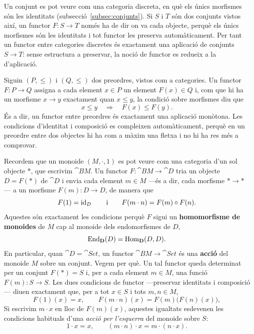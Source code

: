 \begin{exemple}
Un conjunt es pot veure com una categoria discreta, en què els únics morfismes són les identitats (subsecció~\ref{subsec:conjunts}). Si $S$ i $T$ són dos conjunts vistos així, un functor $F\colon S\to T$ només ha de dir on va cada objecte, perquè els únics morfismes són les identitats i tot functor les preserva automàticament. Per tant un functor entre categories discretes és exactament una aplicació de conjunts $S\to T$: sense estructura a preservar, la noció de functor es redueix a la d'aplicació.
\end{exemple}

\begin{exemple}
Siguin $(P,\leq)$ i $(Q,\leq)$ dos preordres, vistos com a categories. Un functor $F\colon P\to Q$ assigna a cada element $x\in P$ un element $F(x)\in Q$ i, com que hi ha un morfisme $x\to y$ exactament quan $x\leq y$, la condició sobre morfismes diu que
\[
x\leq y
\quad\Longrightarrow\quad
F(x)\leq F(y).
\]
És a dir, un functor entre preordres és exactament una aplicació monòtona. Les condicions d'identitat i composició es compleixen automàticament, perquè en un preordre entre dos objectes hi ha com a màxim una fletxa i no hi ha res més a comprovar.
\end{exemple}

\begin{exemple}\label{ex:functors-monoide}
Recordem que un monoide $(M,\cdot,1)$ es pot veure com una categoria d'un sol objecte $\ast$, que escrivim $\cat{B}M$. Un functor $F\colon\cat{B}M\to\cat{D}$ tria un objecte $D=F(\ast)$ de $\cat{D}$ i envia cada element $m\in M$ ---és a dir, cada morfisme $\ast\to\ast$--- a un morfisme $F(m)\colon D\to D$, de manera que
\[
F(1)=\operatorname{id}_D
\qquad\text{i}\qquad
F(m\cdot n)=F(m)\circ F(n).
\]
Aquestes són exactament les condicions perquè $F$ sigui un \textbf{homomorfisme de monoides} de $M$ cap al monoide dels endomorfismes de $D$,
\[
\mathrm{End}_{\mathbf{D}}(D)=\operatorname{Hom}_{\mathbf{D}}(D,D).
\]
En particular, quan $\cat{D}=\cat{Set}$, un functor $\cat{B}M\to\cat{Set}$ és una \textbf{acció} del monoide $M$ sobre un conjunt. Vegem per què. Un tal functor queda determinat per un conjunt $F(\ast)=S$ i, per a cada element $m\in M$, una funció $F(m)\colon S\to S$. Les dues condicions de functor ---preservar identitats i composició--- diuen exactament que, per a tot $x\in S$ i tots $m,n\in M$,
\[
F(1)(x)=x,
\qquad
F(m\cdot n)(x)=F(m)\bigl(F(n)(x)\bigr),
\]
Si escrivim $m\cdot x$ en lloc de $F(m)(x)$, aquestes igualtats esdevenen les condicions habituals d'una \emph{acció per l'esquerra} del monoide sobre $S$:
\[
1\cdot x=x,
\qquad
(m\cdot n)\cdot x=m\cdot(n\cdot x).
\]
\end{exemple}

